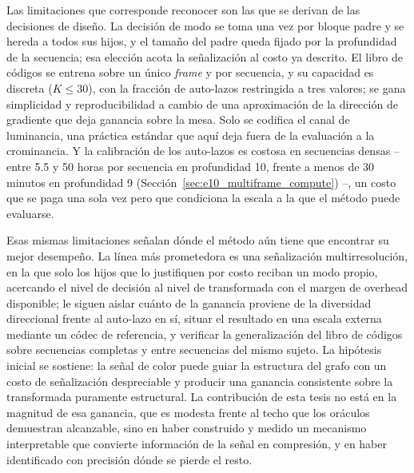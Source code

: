 Las limitaciones que corresponde reconocer son las que se derivan de las decisiones de diseño.
La decisión de modo se toma una vez por bloque padre y se hereda a todos sus hijos, y el tamaño
del padre queda fijado por la profundidad de la secuencia; esa elección acota la señalización
al costo ya descrito. El libro de códigos se entrena sobre un único \textit{frame} y por
secuencia, y su capacidad es discreta ($K\leq30$), con la fracción de auto-lazos restringida a
tres valores; se gana simplicidad y reproducibilidad a cambio de una aproximación de la
dirección de gradiente que deja ganancia sobre la mesa. Solo se codifica el canal de luminancia,
una práctica estándar que aquí deja fuera de la evaluación a la crominancia. Y la calibración
de los auto-lazos es costosa en secuencias densas -- entre 5.5 y 50 horas por secuencia en
profundidad 10, frente a menos de 30 minutos en profundidad 9
(Sección~\ref{sec:e10_multiframe_compute}) --, un costo que se paga una sola vez pero que
condiciona la escala a la que el método puede evaluarse.

Esas mismas limitaciones señalan dónde el método aún tiene que encontrar su mejor desempeño. La
línea más prometedora es una señalización multirresolución, en la que solo los hijos que lo
justifiquen por costo reciban un modo propio, acercando el nivel de decisión al nivel de
transformada con el margen de overhead disponible; le siguen aislar cuánto de la ganancia
proviene de la diversidad direccional frente al auto-lazo en sí, situar el resultado en una
escala externa mediante un códec de referencia, y verificar la generalización del libro de
códigos sobre secuencias completas y entre secuencias del mismo sujeto. La hipótesis inicial se
sostiene: la señal de color puede guiar la estructura del grafo con un costo de señalización
despreciable y producir una ganancia consistente sobre la transformada puramente estructural.
La contribución de esta tesis no está en la magnitud de esa ganancia, que es modesta frente al
techo que los oráculos demuestran alcanzable, sino en haber construido y medido un mecanismo
interpretable que convierte información de la señal en compresión, y en haber identificado con
precisión dónde se pierde el resto.
